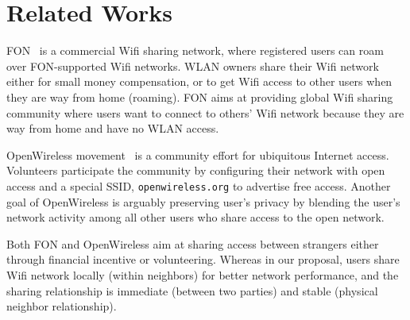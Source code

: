 \section{Related Works}
\label{sec:related}

FON~\cite{fon} is a commercial Wifi sharing network, where registered users can
roam over FON-supported Wifi networks. WLAN owners share their Wifi network
either for small money compensation, or to get Wifi access to other users when
they are way from home (roaming). FON aims at providing global Wifi sharing
community where users want to connect to others' Wifi network because they
are way from home and have no WLAN access. 

OpenWireless movement~\cite{openwireless} is a community effort for ubiquitous
Internet access. Volunteers participate the community by configuring their
\wifi{} network with open access and a special SSID, \texttt{openwireless.org}
to advertise free access. Another goal of OpenWireless is arguably preserving user's
privacy by blending the user's network activity among all other users who share
access to the open \wifi{} network.

Both FON and OpenWireless aim at sharing \wifi{} access between strangers either
through financial incentive or volunteering. Whereas in our proposal, users share
Wifi network locally (within neighbors) for better network performance, and the
sharing relationship is immediate (between two parties) and stable (physical
neighbor relationship).
